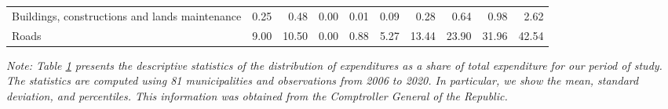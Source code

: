 \begin{table}[h]
\begin{center}
{\begin{tabular}{lrrrrrrrrr}
Buildings, constructions and lands maintenance & 0.25 & 0.48 & 0.00 & 0.01 & 0.09 & 0.28 & 0.64 & 0.98 & 2.62 \\
Roads & 9.00 & 10.50 & 0.00 & 0.88 & 5.27 & 13.44 & 23.90 & 31.96 & 42.54 \\
\hline
\hline
\end{tabular}}
\label{table:sharesumm}
\end{center}
\footnotesize
\textit{Note: Table \ref{table:sharesumm} presents the descriptive statistics of the distribution of expenditures as a share of total expenditure for our period of study. The statistics are computed using 81 municipalities and observations from 2006 to 2020. In particular, we show the mean, standard deviation, and percentiles. This information was obtained from the Comptroller General of the Republic.}
\end{table}
